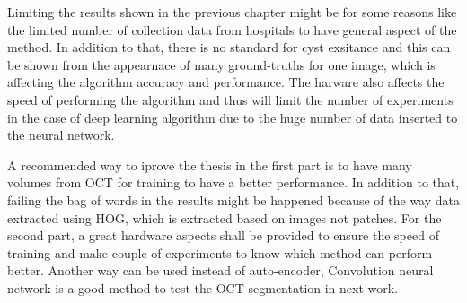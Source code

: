 Limiting the results shown in the previous chapter might be for some reasons like the limited number of collection data from hospitals to have general aspect of the method.
In addition to that, there is no standard for cyst exsitance and this can be shown from the appearnace of many ground-truths for one image, which is affecting the algorithm accuracy and performance.
The harware also affects the speed of performing the algorithm and thus will limit the number of experiments in the case of deep learning algorithm due to the huge number of data inserted to the neural network.

A recommended way to iprove the thesis in the first part is to have many volumes from OCT for training to have a better performance.
In addition to that, failing the bag of words in the results might be happened because of the way data extracted using HOG, which is extracted based on images not patches.
For the second part, a great hardware aspects shall be provided to ensure the speed of training and make couple of experiments to know which method can perform better.
Another way can be used instead of auto-encoder, Convolution neural network is a good method to test the OCT segmentation in next work.